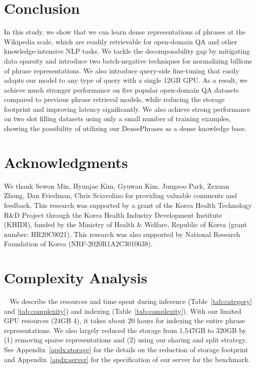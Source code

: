 \documentclass[11pt,a4paper]{article}
\newcommand{\ours}{DensePhrases}
\begin{document}
 

\section{Conclusion}
\label{sec:conclusion}

In this study, we show that we can learn dense representations of phrases at the Wikipedia scale, which are readily retrievable for open-domain QA and other knowledge-intensive NLP tasks.
We tackle the decomposability gap by mitigating data sparsity and introduce two batch-negative techniques for normalizing billions of phrase representations.
We also introduce query-side fine-tuning that easily adapts our model to any type of query with a single 12GB GPU.
As a result, we achieve much stronger performance on five popular open-domain QA datasets compared to previous phrase retrieval models, while reducing the storage footprint and improving latency significantly.
We also achieve strong performance on two slot filling datasets using only a small number of training examples, showing the possibility of utilizing our {\ours} as a dense knowledge base.
 
\section*{Acknowledgments}
We thank Sewon Min, Hyunjae Kim, Gyuwan Kim, Jungsoo Park, Zexuan Zhong, Dan Friedman, Chris Sciavolino for providing valuable comments and feedback.
This research was supported by a grant of the Korea Health Technology R\&D Project through the Korea Health Industry Development Institute (KHIDI), funded by the Ministry of Health \& Welfare, Republic of Korea (grant number: HR20C0021). This research was also supported by National Research Foundation of Korea (NRF-2020R1A2C3010638).





\clearpage
\appendix
\setcounter{table}{0}
\renewcommand{\thetable}{\Alph{section}.\arabic{table}}

\section{Complexity Analysis}~\label{apdx:complexity}
We describe the resources and time spent during inference (Table~\ref{tab:category} and \ref{tab:complexity}) and indexing (Table~\ref{tab:complexity}).
With our limited GPU resources (24GB  4), it takes about 20 hours for indexing the entire phrase representations.
We also largely reduced the storage from 1,547GB to 320GB by (1) removing sparse representations and (2) using our sharing and split strategy.
See Appendix~\ref{apdx:storage} for the details on the reduction of storage footprint and Appendix~\ref{apdx:server} for the specification of our server for the benchmark.
\end{document}

